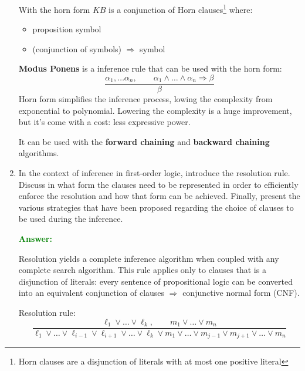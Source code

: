 \documentclass[12pt]{article}
\begin{document}
\begin{enumerate}[label=\textbf{PL.\arabic*}]
    With the horn form $KB$ is a conjunction of Horn clauses\footnote{Horn clauses are a disjunction of literals with at most one positive literal} where: 
    \begin{itemize}
        \item proposition symbol
        \item (conjunction of symbols) $\Rightarrow$ symbol 
    \end{itemize} 
    \textbf{Modus Ponens} is a inference rule that can be used with the horn form: 
    \begin{equation}
        \frac{\alpha_1,\ldots\alpha_n,\qquad \alpha_1\land\ldots\land\alpha_n\Rightarrow\beta}{\beta}
    \end{equation}
    Horn form simplifies the inference process, lowing the complexity from exponential to polynomial.
    Lowering the complexity is a huge improvement, but it's come with a cost: less expressive power.

    It can be used with the \textbf{forward chaining} and \textbf{backward chaining} algorithms.

    \item In the context of inference in first-order logic, introduce the resolution rule.
    Discuss in what form the clauses need to be represented in order to efficiently enforce the resolution and how that form can be achieved.
    Finally, present the various strategies that have been proposed regarding the choice of clauses to be used during the inference.
    
    \textcolor{green}{\textbf{Answer:}}

    Resolution yields a complete inference algorithm when coupled with any complete search algorithm.
    This rule applies only to clauses that is a disjunction of literals: 
    every sentence of propositional logic can be converted into an equivalent conjunction of clauses $\Rightarrow$ conjunctive normal form (CNF).

    Resolution rule:
    \begin{equation}
        \frac{\ell_1\lor\ldots\lor\ell_k,\qquad m_1\lor\ldots\lor m_n}{\ell_1\lor\ldots\lor\ell_{i-1}\lor\ell_{i+1}\lor\ldots\lor\ell_k\lor m_1\lor\ldots\lor m_{j-1}\lor m_{j+1}\lor\ldots\lor m_n}
    \end{equation}


\end{enumerate}
\end{document}
